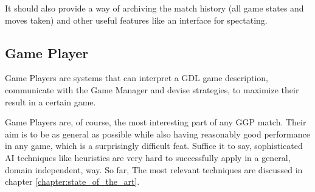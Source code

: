It should also provide a way of archiving the match history (all game states and moves taken) and other useful features like an interface for spectating.

\subsection{Game Player}
Game Players are systems that can interpret a \gls{GDL} game description, communicate with the Game Manager and devise strategies, to maximize their result in a certain game.

Game Players are, of course, the most interesting part of any \gls{GGP} match. Their aim is to be as general as possible while also having reasonably good performance in any game, which is a surprisingly difficult feat. Suffice it to say, sophisticated AI techniques like heuristics are very hard to successfully apply in a general, domain independent, way. So far, 
The most relevant techniques are discussed in chapter \ref{chapter:state_of_the_art}.



